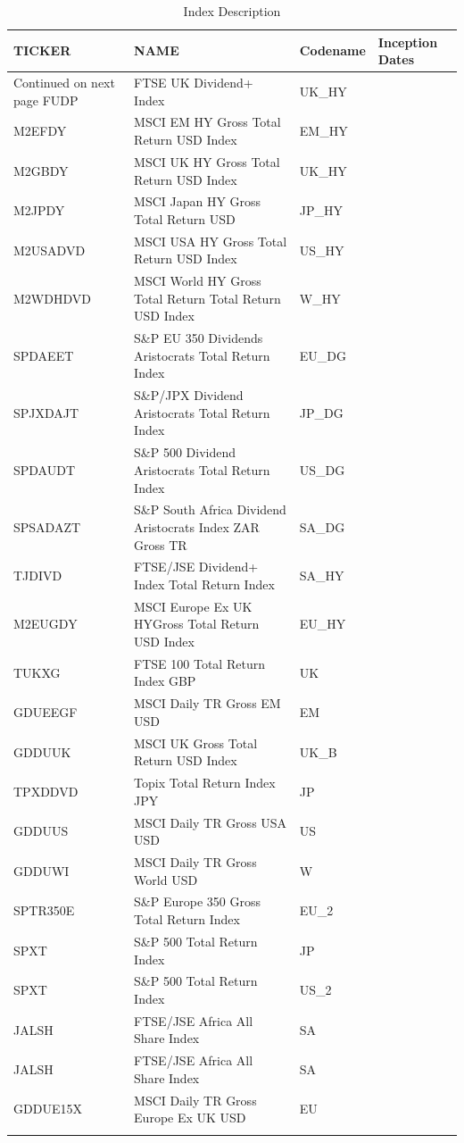 \documentclass[11pt,preprint, authoryear]{elsarticle}
\numberwithin{equation}{section}
\numberwithin{figure}{section}
\numberwithin{table}{section}
\begin{document}
\begingroup\fontsize{8pt}{9pt}\selectfont
\begin{longtable}{llll}
  \toprule
TICKER & NAME & Codename & Inception Dates \\ 
  \hline 
\endhead 
\hline 
{\footnotesize Continued on next page} 
\endfoot 
\endlastfoot 
 \midrule
FUDP & FTSE UK Dividend+ Index & UK\_HY &  \\ 
  M2EFDY & MSCI EM HY Gross Total Return USD Index & EM\_HY &  \\ 
  M2GBDY & MSCI UK HY Gross Total Return USD Index & UK\_HY &  \\ 
  M2JPDY & MSCI Japan HY Gross Total Return USD & JP\_HY &  \\ 
  M2USADVD & MSCI USA HY Gross Total Return USD Index & US\_HY &  \\ 
  M2WDHDVD & MSCI World HY Gross Total Return Total Return USD Index & W\_HY &  \\ 
  SPDAEET & S\&P EU 350 Dividends Aristocrats Total Return Index & EU\_DG &  \\ 
  SPJXDAJT & S\&P/JPX Dividend Aristocrats Total Return Index & JP\_DG &  \\ 
  SPDAUDT & S\&P 500 Dividend Aristocrats Total Return Index & US\_DG &  \\ 
  SPSADAZT & S\&P South Africa Dividend Aristocrats Index ZAR Gross TR & SA\_DG &  \\ 
  TJDIVD & FTSE/JSE Dividend+ Index Total Return Index & SA\_HY &  \\ 
  M2EUGDY & MSCI Europe Ex UK HYGross Total Return USD Index & EU\_HY &  \\ 
  TUKXG & FTSE 100 Total Return Index GBP & UK &  \\ 
  GDUEEGF & MSCI Daily TR Gross EM USD & EM &  \\ 
  GDDUUK & MSCI UK Gross Total Return USD Index & UK\_B &  \\ 
  TPXDDVD & Topix Total Return Index JPY & JP &  \\ 
  GDDUUS & MSCI Daily TR Gross USA USD & US &  \\ 
  GDDUWI & MSCI Daily TR Gross World USD & W &  \\ 
  SPTR350E & S\&P Europe 350 Gross Total Return Index & EU\_2 &  \\ 
  SPXT & S\&P 500 Total Return Index & JP &  \\ 
  SPXT & S\&P 500 Total Return Index & US\_2 &  \\ 
  JALSH & FTSE/JSE Africa All Share Index & SA &  \\ 
  JALSH & FTSE/JSE Africa All Share Index & SA &  \\ 
  GDDUE15X & MSCI Daily TR Gross Europe Ex UK USD & EU &  \\ 
   \bottomrule
\caption{Index Description \label{tabdes}} 
\end{longtable}
\endgroup
\end{document}

